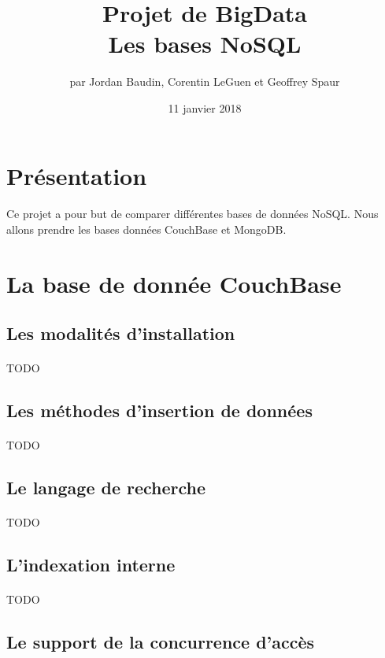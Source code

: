 \documentclass{article}
\title{Projet de BigData \\ Les bases NoSQL}
\author{par Jordan Baudin, Corentin LeGuen et Geoffrey Spaur}
\date{11 janvier 2018}
\begin{document}
\maketitle
\newpage
\tableofcontents{}
\newpage
\section{Présentation}
  \paragraph{}
  Ce projet a pour but de comparer différentes bases de données NoSQL.
  Nous allons prendre les bases données CouchBase et MongoDB.
  
  
\section{La base de donnée CouchBase}
\subsection{Les modalités d’installation}
  \paragraph{} TODO
\subsection{Les méthodes d’insertion de données}
  \paragraph{} TODO
\subsection{Le langage de recherche}
  \paragraph{} TODO
\subsection{L’indexation interne}
  \paragraph{} TODO
\subsection{Le support de la concurrence d’accès}
\end{document}
